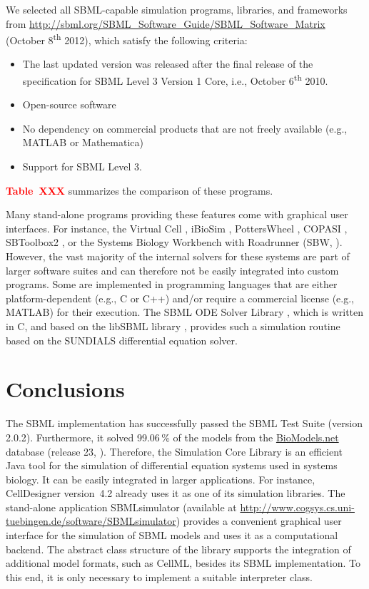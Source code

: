 \documentclass[10pt]{bmc_article}
\newenvironment{bmcformat}{\baselineskip20pt\sloppy\setboolean{publ}{false}}{\baselineskip20pt\sloppy}
\newcommand{\TODO}[1]{\textcolor{red}{\textbf{#1}}}
\begin{document}
\begin{bmcformat}
We selected all SBML-capable simulation programs, libraries, and frameworks from
\url{http://sbml.org/SBML_Software_Guide/SBML_Software_Matrix} (October
8\textsuperscript{th} 2012), which satisfy the following criteria:
\begin{itemize}
  \item The last updated version was released after the final release of
  the specification for SBML Level 3 Version 1 Core, i.e., October
  6\textsuperscript{th} 2010.
  \item Open-source software
  \item No dependency on commercial products that are not freely available
  (e.g., MATLAB\texttrademark{} or Mathematica\texttrademark)
  \item Support for SBML Level 3.   
\end{itemize}
\TODO{Table~XXX} summarizes the comparison of these programs.

Many stand-alone programs providing these features come with
graphical user interfaces.
For instance, the Virtual Cell \cite{Loew2001}, iBioSim \cite{Myers2009},
PottersWheel \cite{Maiwald2008}, COPASI \cite{Hoops2006}, SBToolbox2
\cite{SBT_Schmidt2006}, or the Systems Biology Workbench with Roadrunner (SBW, \cite{Bergmann06}). 
However, the vast majority of the internal solvers for these systems are part of
larger software suites and can therefore not be easily integrated into custom
programs. Some are implemented in programming languages that are either
platform-dependent (e.g., C or C++) and/or require a commercial license (e.g.,
MATLAB\texttrademark{}) for their execution.
The SBML ODE Solver Library \cite{Machne2006}, which is written in C,
and based on the libSBML library \cite{Bornstein2008}, 
provides such a simulation routine based on the SUNDIALS differential equation
solver.

\section{Conclusions}
The SBML implementation has successfully passed the
SBML Test Suite (version 2.0.2).
Furthermore, it solved 99.06\,\% of the models from the
\href{http://biomodels.net}{BioModels.net} database (release 23,
\cite{Novere2006a}).
Therefore, the Simulation Core Library is an efficient Java tool for the
simulation of differential equation systems used in systems biology. It can be
easily integrated in larger applications. For instance,
CellDesigner version~4.2 \cite{Funahashi2003} already uses it as one of its simulation libraries.
The stand-alone application SBMLsimulator (available at
\href{http://www.cogsys.cs.uni-tuebingen.de/software/SBMLsimulator}{http://www.cogsys.cs.uni-tuebingen.de/software/SBMLsimulator})
provides a convenient graphical user interface for the simulation of SBML
models and uses it as a computational backend.
The abstract class structure of the library supports the integration of
additional model formats, such as CellML, besides its SBML implementation. To
this end, it is only necessary to implement a suitable interpreter class.


\end{bmcformat}
\end{document}
